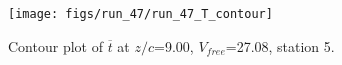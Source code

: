 \begin{figure}[H]
\centering
\texttt{[image: figs/run\_47/run\_47\_T\_contour]}
\caption{Contour plot of $\overline{t}$ at $z/c$=9.00, $V_{free}$=27.08, station 5.}
\label{fig:run_47_T_contour}
\end{figure}


